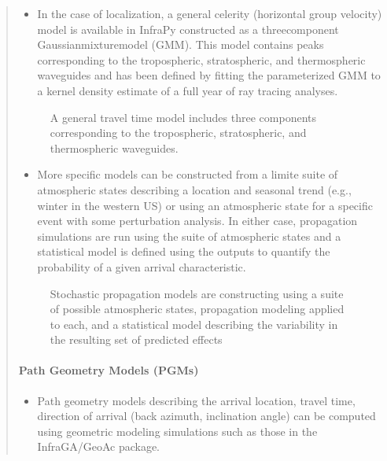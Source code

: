 \documentclass[letterpaper,10pt,english]{sphinxmanual}
\let\sphinxpxdimen\pdfpxdimen\else\newdimen\sphinxpxdimen
\begin{document}
\begin{itemize}
\begin{quote}
\begin{itemize}
\item {} 
In the case of localization, a general celerity (horizontal group velocity) model is available in InfraPy constructed as a three\sphinxhyphen{}component Gaussian\sphinxhyphen{}mixture\sphinxhyphen{}model (GMM).  This model contains peaks corresponding to the tropospheric, stratospheric, and thermospheric waveguides and has been defined by fitting the parameterized GMM to a kernel density estimate of a full year of ray tracing analyses.

\end{itemize}

\begin{figure}[htbp]
\centering
\capstart

\noindent\sphinxincludegraphics[width=500\sphinxpxdimen]{{cel_dist}.jpg}
\caption{A general travel time model includes three components corresponding to the tropospheric, stratospheric, and thermospheric waveguides.}\label{\detokenize{propagation:id1}}\end{figure}
\begin{itemize}
\item {} 
More specific models can be constructed from a limite suite of atmospheric states describing a location and seasonal trend (e.g., winter in the western US) or using an atmospheric state for a specific event with some perturbation analysis.  In either case, propagation simulations are run using the suite of atmospheric states and a statistical model is defined using the outputs to quantify the probability of a given arrival characteristic.

\end{itemize}

\begin{figure}[htbp]
\centering
\capstart

\noindent\sphinxincludegraphics[width=500\sphinxpxdimen]{{stochprop_fig1}.jpg}
\caption{Stochastic propagation models are constructing using a suite of possible atmospheric states, propagation modeling applied to each, and a statistical model describing the variability in the resulting set of predicted effects}\label{\detokenize{propagation:id2}}\end{figure}


\paragraph{Path Geometry Models (PGMs)}
\label{\detokenize{propagation:path-geometry-models-pgms}}\begin{itemize}
\item {} 
Path geometry models describing the arrival location, travel time, direction of arrival (back azimuth, inclination angle) can be computed using geometric modeling simulations such as those in the InfraGA/GeoAc package.


\end{itemize}
\end{quote}
\end{itemize}
\end{document}

